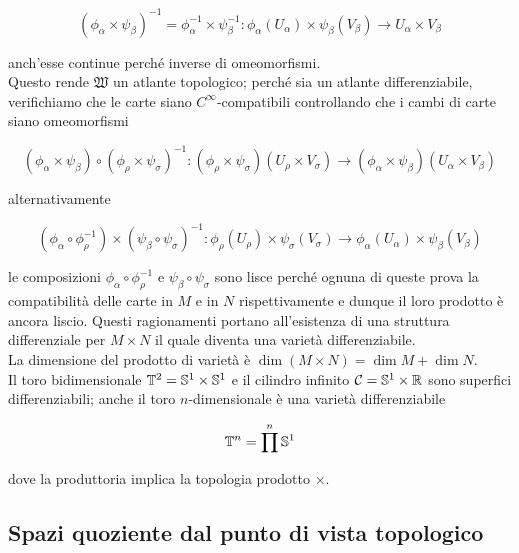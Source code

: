 \begin{equation}
	(\phi_{\alpha} \times \psi_{\beta})^{-1} = \phi_{\alpha}^{-1} \times \psi_{\beta}^{-1} : \phi_{\alpha}(U_{\alpha}) \times \psi_{\beta}(V_{\beta}) \to U_{\alpha} \times V_{\beta}
\end{equation}

anch'esse continue perché inverse di omeomorfismi.\\
Questo rende $ \mathfrak{W} $ un atlante topologico; perché sia un atlante differenziabile, verifichiamo che le carte siano $ C^{\infty} $-compatibili controllando che i cambi di carte siano omeomorfismi

\begin{equation}
	(\phi_{\alpha} \times \psi_{\beta}) \circ (\phi_{\rho} \times \psi_{\sigma})^{-1} : (\phi_{\rho} \times \psi_{\sigma})(U_{\rho} \times V_{\sigma}) \to (\phi_{\alpha} \times \psi_{\beta})(U_{\alpha} \times V_{\beta})
\end{equation}

alternativamente

\begin{equation}
	(\phi_{\alpha} \circ \phi_{\rho}^{-1}) \times (\psi_{\beta} \circ \psi_{\sigma})^{-1} : \phi_{\rho}(U_{\rho}) \times \psi_{\sigma}(V_{\sigma}) \to \phi_{\alpha}(U_{\alpha}) \times \psi_{\beta}(V_{\beta})
\end{equation}

le composizioni $ \phi_{\alpha} \circ \phi_{\rho}^{-1} $ e $ \psi_{\beta} \circ \psi_{\sigma} $ sono lisce perché ognuna di queste prova la compatibilità delle carte in $ M $ e in $ N $ rispettivamente e dunque il loro prodotto è ancora liscio. Questi ragionamenti portano all'esistenza di una struttura differenziale per $ M \times N $ il quale diventa una varietà differenziabile.\\
La dimensione del prodotto di varietà è $ \dim (M \times N) = \dim M + \dim N $.\\
Il toro bidimensionale $ \mathbb{T}^{2} = \mathbb{S}^{1} \times \mathbb{S}^{1} $ e il cilindro infinito $ \mathcal{C} = \mathbb{S}^{1} \times \mathbb{R} $ sono superfici differenziabili; anche il toro $ n $-dimensionale è una varietà differenziabile

\begin{align}
	\mathbb{T}^{n} = \prod^{n} \mathbb{S}^{1}
\end{align}

dove la produttoria implica la topologia prodotto $ \times $.

\subsection{Spazi quoziente dal punto di vista topologico}

